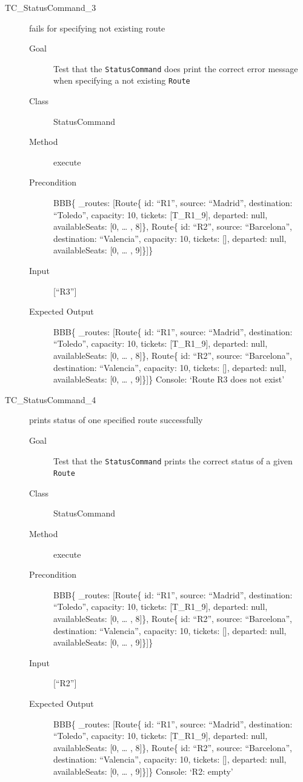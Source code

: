 \documentclass[11pt]{article}
\begin{document}
\begin{description}
\item[{TC\_StatusCommand\_3}] fails for specifying not existing route
\begin{description}
\item[{Goal}] Test that the \texttt{StatusCommand} does print the correct error message when specifying a not existing \texttt{Route}
\item[{Class}] StatusCommand
\item[{Method}] execute
\item[{Precondition}] BBB\{ \_routes: [Route\{ id: “R1”, source: “Madrid”, destination: “Toledo”, capacity: 10,  tickets: [T\_R1\_9], departed: null, availableSeats: [0, … , 8]\}, Route\{ id: “R2”, source: “Barcelona”, destination: “Valencia”, capacity: 10,  tickets: [], departed: null, availableSeats: [0, … , 9]\}]\}
\item[{Input}] [“R3”]
\item[{Expected Output}] BBB\{ \_routes: [Route\{ id: “R1”, source: “Madrid”, destination: “Toledo”, capacity: 10,  tickets: [T\_R1\_9], departed: null, availableSeats: [0, … , 8]\}, Route\{ id: “R2”, source: “Barcelona”, destination: “Valencia”, capacity: 10,  tickets: [], departed: null, availableSeats: [0, … , 9]\}]\}
Console: ‘Route R3 does not exist’
\end{description}

\item[{TC\_StatusCommand\_4}] prints status of one specified route successfully
\begin{description}
\item[{Goal}] Test that the \texttt{StatusCommand} prints the correct status of a given \texttt{Route}
\item[{Class}] StatusCommand
\item[{Method}] execute
\item[{Precondition}] BBB\{ \_routes: [Route\{ id: “R1”, source: “Madrid”, destination: “Toledo”, capacity: 10,  tickets: [T\_R1\_9], departed: null, availableSeats: [0, … , 8]\}, Route\{ id: “R2”, source: “Barcelona”, destination: “Valencia”, capacity: 10,  tickets: [], departed: null, availableSeats: [0, … , 9]\}]\}
\item[{Input}] [“R2”]
\item[{Expected Output}] BBB\{ \_routes: [Route\{ id: “R1”, source: “Madrid”, destination: “Toledo”, capacity: 10,  tickets: [T\_R1\_9], departed: null, availableSeats: [0, … , 8]\}, Route\{ id: “R2”, source: “Barcelona”, destination: “Valencia”, capacity: 10,  tickets: [], departed: null, availableSeats: [0, … , 9]\}]\}
Console: ‘R2: empty’
\end{description}


\end{description}
\end{document}
